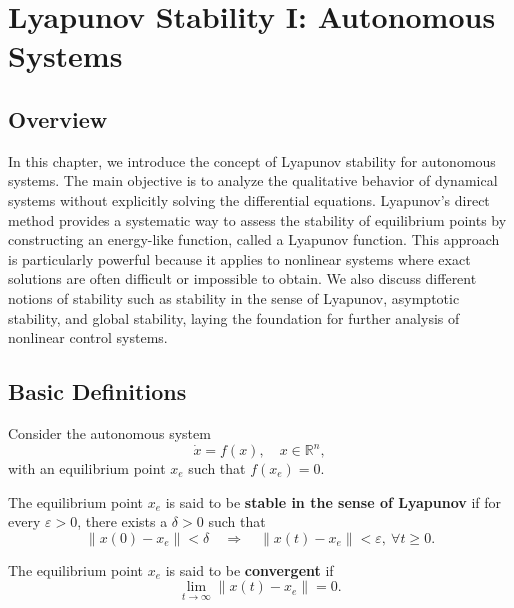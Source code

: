 \chapterspaceabove{6.75cm} %
\chapterspacebelow{7.25cm} %

\chapter{Lyapunov Stability I: Autonomous Systems}

\section{Overview}
In this chapter, we introduce the concept of Lyapunov stability for autonomous systems. The main objective is to analyze the qualitative behavior of dynamical systems without explicitly solving the differential equations. Lyapunov’s direct method provides a systematic way to assess the stability of equilibrium points by constructing an energy-like function, called a Lyapunov function. 
This approach is particularly powerful because it applies to nonlinear systems where exact solutions are often difficult or impossible to obtain. We also discuss different notions of stability such as stability in the sense of Lyapunov, asymptotic stability, and global stability, laying the foundation for further analysis of nonlinear control systems.

\section{Basic Definitions}

Consider the autonomous system
\begin{equation}
    \dot{x} = f(x), \quad x \in \mathbb{R}^n,
\end{equation}
with an equilibrium point $x_e$ such that $f(x_e) = 0$.

\begin{definition}[Stability]
The equilibrium point $x_e$ is said to be \textbf{stable in the sense of Lyapunov} if for every $\varepsilon > 0$, there exists a $\delta > 0$ such that
\[
    \|x(0) - x_e\| < \delta \quad \Rightarrow \quad \|x(t) - x_e\| < \varepsilon, \ \forall t \geq 0.
\]
\end{definition}

\begin{definition}[Convergence]
The equilibrium point $x_e$ is said to be \textbf{convergent} if
\[
    \lim_{t \to \infty} \|x(t) - x_e\| = 0.
\]
\end{definition}


